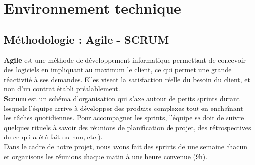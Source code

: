 \documentclass[12pt]{report}
\begin{document}
	  \section{Environnement technique}
	  \subsection{Méthodologie : Agile - SCRUM}
	    \textbf{Agile} est une méthode de développement informatique permettant de concevoir des logiciels en impliquant au maximum le client, ce qui permet une grande réactivité à ses demandes. Elles visent la satisfaction réelle du besoin du client, et non d'un contrat établi préalablement.
	    \\\textbf{Scrum} est un schéma d’organisation qui s’axe autour de petits sprints durant lesquels l’équipe arrive à développer des produits complexes tout en enchaînant les tâches quotidiennes. Pour accompagner les sprints, l’équipe se doit de suivre quelques rituels à savoir des réunions de planification de projet, des rétrospectives de ce qui a été fait ou non, etc.).
	    \\Dans le cadre de notre projet, nous avons fait des sprints de une semaine chacun et organisons les réunions chaque matin à une heure convenue (9h).
	 
\end{document}
